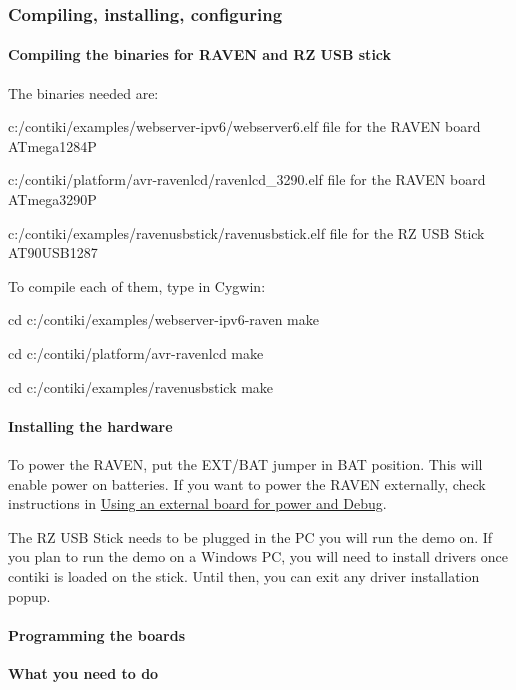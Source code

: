 \hypertarget{a00058_installation}{}\subsubsection{\-Compiling, installing, configuring}\label{a00058_installation}
\hypertarget{a00058_installation_compiling}{}\paragraph{\-Compiling the binaries for R\-A\-V\-E\-N and R\-Z U\-S\-B stick}\label{a00058_installation_compiling}
\-The binaries needed are\-: \begin{DoxyItemize}
\item c\-:/contiki/examples/webserver-\/ipv6/webserver6.elf file for the \-R\-A\-V\-E\-N board \-A\-Tmega1284\-P \item c\-:/contiki/platform/avr-\/ravenlcd/ravenlcd\-\_\-3290.elf file for the \-R\-A\-V\-E\-N board \-A\-Tmega3290\-P \item c\-:/contiki/examples/ravenusbstick/ravenusbstick.elf file for the \-R\-Z \-U\-S\-B \-Stick \-A\-T90\-U\-S\-B1287\end{DoxyItemize}
\-To compile each of them, type in \-Cygwin\-: \begin{DoxyVerb}
cd c:/contiki/examples/webserver-ipv6-raven
make
\end{DoxyVerb}
 \begin{DoxyVerb}
cd c:/contiki/platform/avr-ravenlcd
make
\end{DoxyVerb}
 \begin{DoxyVerb}
cd c:/contiki/examples/ravenusbstick
make
\end{DoxyVerb}
\hypertarget{a00058_installation_hw}{}\paragraph{\-Installing the hardware}\label{a00058_installation_hw}
\-To power the \-R\-A\-V\-E\-N, put the \-E\-X\-T/\-B\-A\-T jumper in \-B\-A\-T position. \-This will enable power on batteries. \-If you want to power the \-R\-A\-V\-E\-N externally, check instructions in \hyperlink{a00058_advanced_externalboard}{\-Using an external board for power and \-Debug}.

\-The \-R\-Z \-U\-S\-B \-Stick needs to be plugged in the \-P\-C you will run the demo on. \-If you plan to run the demo on a \-Windows \-P\-C, you will need to install drivers once contiki is loaded on the stick. \-Until then, you can exit any driver installation popup.\hypertarget{a00058_installation_loading}{}\paragraph{\-Programming the boards}\label{a00058_installation_loading}
{\bfseries \-What you need to do}\par


